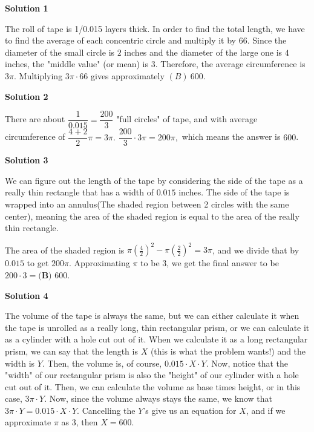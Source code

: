 \begin{enumerate}
\textbf{Solution 1}

The roll of tape is 1/0.015  layers thick. In order to find the total length, we have to find the average of each concentric circle and multiply it by $66$. Since the diameter of the small circle is $2$ inches and the diameter of the large one is $4$ inches, the "middle value" (or mean) is $3$. Therefore, the average circumference is $3\pi$. Multiplying $3\pi \cdot 66$ gives approximately $\boxed{(B)\ 600}$.

 



\textbf{Solution 2}

There are about $\dfrac{1}{0.015}=\dfrac{200}{3}$ "full circles" of tape, and with average circumference of $\dfrac{4+2}{2}\pi=3\pi.$ $\dfrac{200}{3} \cdot 3\pi=200\pi,$ which means the answer is $\boxed{600}$.

 



\textbf{Solution 3}

We can figure out the length of the tape by considering the side of the tape as a really thin rectangle that has a width of $0.015$ inches. The side of the tape is wrapped into an annulus(The shaded region between 2 circles with the same center), meaning the area of the shaded region is equal to the area of the really thin rectangle. 

 The area of the shaded region is $\pi(\frac{4}{2})^2 -\pi(\frac{2}{2})^2 = 3\pi$, and we divide that by $0.015$ to get $200\pi$. Approximating $\pi$ to be 3, we get the final answer to be $200 \cdot 3 = \textbf {(B) } 600$.

 



\textbf{Solution 4}

The volume of the tape is always the same, but we can either calculate it when the tape is unrolled as a really long, thin rectangular prism, or we can calculate it as a cylinder with a hole cut out of it. When we calculate it as a long rectangular prism, we can say that the length is $X$ (this is what the problem wants!) and the width is $Y$. Then, the volume is, of course, $0.015 \cdot X \cdot Y.$ Now, notice that the "width" of our rectangular prism is also the "height" of our cylinder with a hole cut out of it. Then, we can calculate the volume as base times height, or in this case, $3\pi \cdot Y.$ Now, since the volume always stays the same, we know that $3\pi \cdot Y = 0.015 \cdot X \cdot Y.$ Cancelling the $Y$'s give us an equation for $X$, and if we approximate $\pi$ as $3$, then $X = \boxed {600}$.


\end{enumerate}
